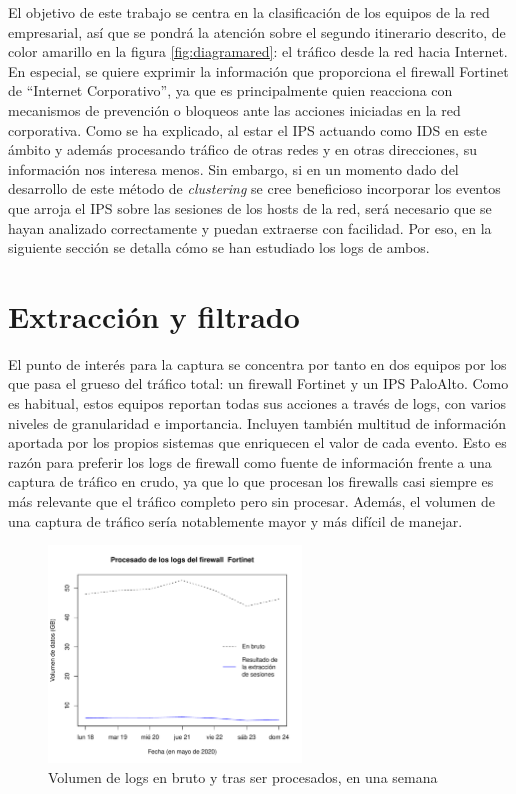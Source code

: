 El objetivo de este trabajo se centra en la clasificación de los equipos de la red empresarial, así que se pondrá la atención sobre el segundo itinerario descrito, de color amarillo en la figura \ref{fig:diagramared}: el tráfico desde la red hacia Internet.
En especial, se quiere exprimir la información que proporciona el firewall Fortinet de ``Internet Corporativo'', ya que es principalmente quien reacciona con mecanismos de prevención o bloqueos ante las acciones iniciadas en la red corporativa.
Como se ha explicado, al estar el IPS actuando como IDS en este ámbito y además procesando tráfico de otras redes y en otras direcciones, su información nos interesa menos.
Sin embargo, si en un momento dado del desarrollo de este método de \emph{clustering} se cree beneficioso incorporar los eventos que arroja el IPS sobre las sesiones de los hosts de la red,
será necesario que se hayan analizado correctamente y puedan extraerse con facilidad.
Por eso, en la siguiente sección se detalla cómo se han estudiado los logs de ambos.

\section{Extracción y filtrado}\label{sec:extraccionyfiltrado}

El punto de interés para la captura se concentra por tanto en dos equipos por los que pasa el grueso del tráfico total: un firewall Fortinet y un IPS PaloAlto.
Como es habitual, estos equipos reportan todas sus acciones a través de logs, con varios niveles de granularidad e importancia.
Incluyen también multitud de información aportada por los propios sistemas que enriquecen el valor de cada evento.
Esto es razón para preferir los logs de firewall como fuente de información frente a una captura de tráfico en crudo, ya que
lo que procesan los firewalls casi siempre es más relevante que el tráfico completo pero sin procesar.
Además, el volumen de una captura de tráfico sería notablemente mayor y más difícil de manejar.

\begin{figure}[h]
    \centering
    \includegraphics[width=0.6\textwidth]{contenido/fig/volumen_logs.pdf}
    \caption{Volumen de logs en bruto y tras ser procesados, en una semana}
    \label{fig:volumenlogs}
\end{figure}

